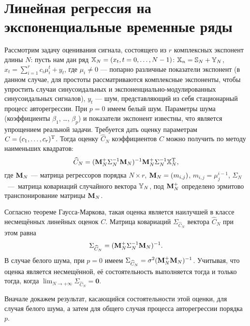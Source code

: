 \documentclass[12pt,a4paper]{article}
\begin{document}
\section{Линейная регрессия на экспоненциальные временные ряды}
Рассмотрим задачу оценивания сигнала, состоящего из $r$ комплексных экспонент длины $N$: пусть нам дан ряд $\mathbb{X}_N = (x_t, t = 0, \ldots, N-1)$: $\mathbb{X}_n = \mathbb{S}_N + \mathbb{Y}_N$, $x_t = \sum_{i=1}^r c_i \mu_i^t + y_t$, где $\mu_i \ne 0$ --- попарно различные показатели экспонент (в данном случае, для простоты рассматриваются комплексные экспоненты, чтобы упростить случаи синусоидальных и экспоненциально-модулированных синусоидальных сигналов), $y_t$ --- шум, представляющий из себя стационарный процесс авторегрессии. При $p = 0$ имеем белый шум. Параметры шума (коэффициенты $\beta_1$, \ldots, $\beta_p$) и показатели экспонент известны, что является упрощением реальной задачи. Требуется дать оценку параметрам $C = (c_1, \ldots, c_r)^{\mathrm{T}}$. Тогда оценку $\widehat C_N$ коэффициентов $C$ можно получить по методу наименьших квадратов:
\begin{equation*}
\widehat C_N = (\mathbf{M}_N^+ \Sigma_N^{-1} \mathbf{M}_N)^{-1}\mathbf{M}_N^+ \Sigma_N^{-1} \mathbb{X}_N^{\mathrm{T}},
\end{equation*}
где $\mathbf{M}_N$ --- матрица регрессоров порядка $N \times r$, $\mathbf{M}_N = (m_{i, j})$, $m_{i, j} = \mu_j^{i- 1}$, $\Sigma_N$~---~матрица ковариаций случайного вектора $\mathbb{Y}_N$, под $\mathbf{M}_N^+$ определено эрмитово транспонирование матрицы $\mathbf{M}_N$.

Согласно теореме Гаусса-Маркова, такая оценка является наилучшей в классе несмещённых линейных оценок $C$. Матрица ковариаций $\Sigma_{\widehat C_N}$ вектора $\widehat C_N$ при этом равна
\begin{equation*}
\Sigma_{\widehat C_N} = (\mathbf{M}_N^+ \Sigma_N^{-1} \mathbf{M}_N)^{-1}.
\end{equation*}
В случае белого шума, при $p = 0$ имеем $\Sigma_{\widehat C_N} = \sigma^2 (\mathbf{M}_N^+ \mathbf{M}_N)^{-1}$. Учитывая, что оценка является несмещённой, её состоятельность выполняется тогда и только тогда, когда $ \lim_{N \to +\infty} \Sigma_{\widehat C_N} = \mathbf{0}$.

Вначале докажем результат, касающийся состоятельности этой оценки, для случая белого шума, а затем для общего случая процесса авторегрессии порядка $p$.
\end{document}

